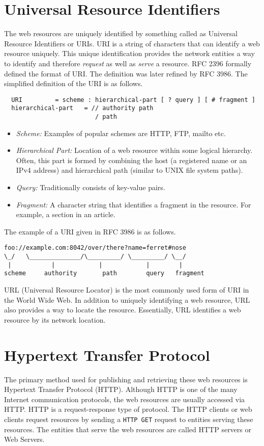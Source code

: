 \section{Universal Resource Identifiers}
The web resources are uniquely identified by something called as
Universal Resource Identifiers or URIs. URI is a string of characters
that can identify a web resource uniquely. This unique identification
provides the network entities a way to identify and therefore
\emph{request} as well as \emph{serve} a resource. RFC 2396 formally
defined the format of URI. The definition was later refined by RFC
3986. The simplified definition of the URI is as follows.
\begin{center}
  \begin{verbatim}
  URI         = scheme : hierarchical-part [ ? query ] [ # fragment ]
  hierarchical-part   = // authority path
                         / path
\end{verbatim}
\end{center}
\begin{itemize}
  \item{\emph{Scheme:}} Examples of popular schemes are HTTP, FTP,
    mailto etc.
  \item{\emph{Hierarchical Part:}} Location of a web resource within
    some logical hierarchy. Often, this part is formed by combining
    the host (a registered name or an IPv4 address) and hierarchical
    path (similar to UNIX file system paths).
  \item{\emph{Query:}} Traditionally consists of key-value pairs.
  \item{\emph{Fragment:}} A character string that identifies a
    fragment in the resource. For example, a section in an article.
\end{itemize}
The example of a URI given in RFC 3986 is as follows.
\begin{verbatim}
foo://example.com:8042/over/there?name=ferret#nose
\_/   \______________/\_________/ \_________/ \__/
 |           |            |            |        |
scheme     authority       path        query   fragment
\end{verbatim}
URL (Universal Resource Locator) is the most commonly used form of URI
in the World Wide Web. In addition to uniquely identifying a web
resource, URL also provides a way to locate the resource. Essentially,
URL identifies a web resource by its network location.
\section{Hypertext Transfer Protocol}
The primary method used for publishing and retrieving these web
resources is Hypertext Transfer Protocol (HTTP). Although HTTP is one
of the many Internet communication protocols, the web resources are
usually accessed via HTTP. HTTP is a request-response type of
protocol. The HTTP clients or web clients request resources by sending
a \texttt{HTTP GET} request to entities serving these resources. The
entities that serve the web resources are called HTTP servers or Web
Servers.

